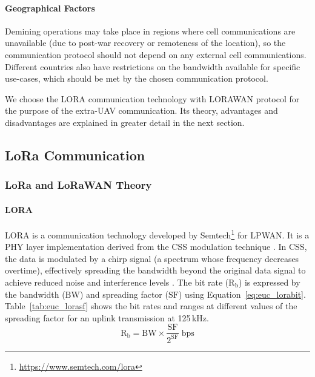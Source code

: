 \paragraph{Geographical Factors} Demining operations may take place in regions where cell communications are unavailable (due to post-war recovery or remoteness of the location), so the communication protocol should not depend on any external cell communications. Different countries also have restrictions on the bandwidth available for specific use-cases, which should be met by the chosen communication protocol. 

We choose the \gls{LORA} communication technology with \gls{LORAWAN} protocol for the purpose of the extra-\gls{UAV} communication. Its theory, advantages and disadvantages are explained in greater detail in the next section. 

\subsection{LoRa Communication}
\label{sec:euc_lora}

\subsubsection{LoRa and LoRaWAN Theory}

\paragraph{LORA} \gls{LORA} is a communication technology developed by Semtech\footnote{\url{https://www.semtech.com/lora}} for \gls{LPWAN}. It is a \gls{PHY} layer implementation derived from the \gls{CSS} modulation technique \cite{semtech2024lora}. In \gls{CSS}, the data is modulated by a chirp signal (a spectrum whose frequency decreases overtime), effectively spreading the bandwidth beyond the original data signal to achieve reduced noise and interference levels \cite{devalal2018lora}. The bit rate ($\mathrm{R_b}$) is expressed by the bandwidth ($\mathrm{BW}$) and spreading factor ($\mathrm{SF}$) using Equation~\ref{eq:euc_lorabit}. Table~\ref{tab:euc_lorasf} shows the bit rates and ranges at different values of the spreading factor for an uplink transmission at 125\,kHz. 
\begin{equation} 
\label{eq:euc_lorabit}
\mathrm{R_b} = \mathrm{BW} \times \frac{\mathrm{SF}}{2^{\mathrm{SF}}} \; \mathrm{bps}
\end{equation}

